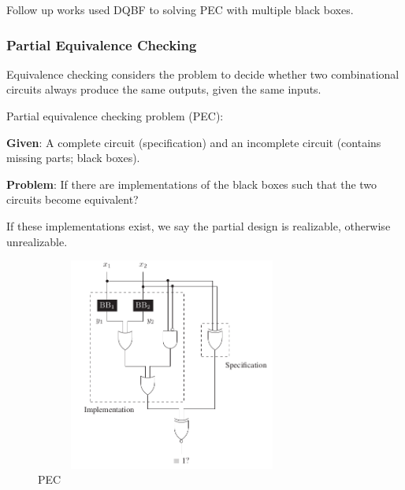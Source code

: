 \documentclass[runningheads]{llncs}
\begin{document}
Follow up works \cite{gitinarswb13, gitinarswb13r, wimmerws018} used DQBF to solving PEC with multiple black boxes.

\subsubsection{Partial Equivalence Checking}\label{sssec:pec}
Equivalence checking considers the problem to decide whether
two combinational circuits always produce the same outputs,
given the same inputs.

Partial equivalence checking problem (PEC):
\par\textbf{Given}: A complete circuit (specification) and an incomplete circuit (contains missing parts; black boxes).
\par\textbf{Problem}: If there are implementations of the black boxes such that the two circuits become equivalent?

If these implementations exist, we say the partial design is realizable, otherwise unrealizable.

\begin{figure}[]
	\includegraphics[width=9cm, height=7cm]{pec}
	\centering
	\caption{PEC}\label{fig:pec}
\end{figure}
\end{document}
